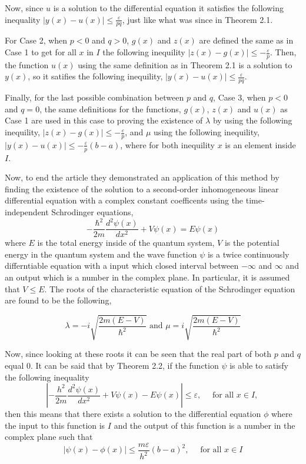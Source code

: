 \documentclass[mla9]{mla}
\begin{document}
\begin{paper}
Now, since $u$ is a solution to the differential equation it satisfies the following inequality $|y(x) - u(x)| \leq \frac{\varepsilon}{p q}$, just like what was since in Theorem 2.1.

For Case 2, when $p < 0$ and $q > 0$, $g(x)$ and $z(x)$ are defined the same as in Case 1 to get for all $x$ in $I$ the following inequility $|z(x) - g(x)| \leq -\frac{\varepsilon}{p}$. Then, the function $u(x)$ using the same definition as in Theorem 2.1 is a solution to $y(x)$, so it satifies the following inequility, $|y(x) - u(x)| \leq \frac{\varepsilon}{p q}$.

Finally, for the last possible combination between $p$ and $q$, Case 3, when $p<0$ and $q=0$, the same definitions for the functions, $g(x)$, $z(x)$ and $u(x)$ as Case 1 are used in this case to proving the existence of $\lambda$ by using the following inequility, $|z(x) - g(x)| \leq -\frac{\varepsilon}{p}$, and $\mu$ using the following inequility, $|y(x) - u(x)| \leq -\frac{\varepsilon}{p}(b-a)$, where for both inequility $x$ is an element inside $I$.

Now, to end the article they demonstrated an application of this method by finding the existence of the solution to a second-order inhomogeneous linear differential equation with a complex constant coefficents using the time-independent Schrodinger equations,
\[-\frac{\hbar^2}{2 m} \frac{d^2 \psi(x)}{d x^2}+V \psi(x)=E \psi(x)\]
where $E$ is the total energy inside of the quantum system, $V$ is the potential energy in the quantum system and the wave function $\psi$ is a twice continuously differntiable equation with a input which closed interval between $-\infty$ and $\infty$ and an output which is a number in the complex plane. In particular, it is assumed that $V \leq E$. The roots of the characteristic equation of the Schrodinger equation are found to be the following,

\[
\lambda=-i \sqrt{\frac{2 m(E-V)}{\hbar^2}} \text { \ \ and \ \ } \mu=i \sqrt{\frac{2 m(E-V)}{\hbar^2}}
\]

Now, since looking at these roots  it can be seen that the real part of both $p$ and $q$ equal 0. It can be said that by Theorem 2.2, if the function $\psi$ is able to satisfy the following inequality
\[\left| -\frac{h^2}{2 m} \frac{d^2 \psi(x)}{d x^2}+V \psi(x)-E \psi(x)\right| \leq \varepsilon, \quad \text { for all } x \in I \text {, }\]
then this means that there exists a solution to the differential equation $\phi$ where the input to this function is $I$ and the output of this function is a number in the complex plane such that
\[
|\psi(x)-\phi(x)| \leq \frac{m \varepsilon}{h^2}(b-a)^2, \quad \text { for all } x \in I
\]


\end{paper}
\end{document}
